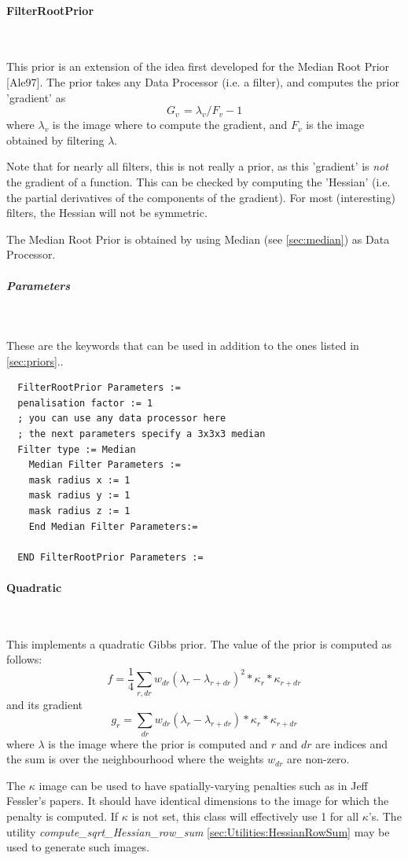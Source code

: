 \documentclass{article}
\newcommand{\subsubsubsection}[1]{\paragraph{#1}\mbox{} \\}
\newcommand{\subsubsubsubsection}[1]{\subparagraph{#1} \mbox{} \\}
\begin{document}
{{{ \subsubsubsection{FilterRootPrior}
}
This prior is an extension of the idea first developed for the 
Median Root Prior [Ale97]. The prior takes any Data Processor 
(i.e. a filter), and computes the prior 'gradient' as 
\[
G_{v\,} =\lambda _{v} /F_{v}  -1
\]
\noindent where 
$\lambda _{v} $
 is the image where to compute the gradient, and 
$F_{v} $ is the image obtained by filtering $\lambda $.

Note that for nearly all filters, this is not really a prior, as 
this 'gradient' is \textit{not} the gradient of a function. This can 
be checked by computing the 'Hessian' (i.e. the partial derivatives 
of the components of the gradient). For most (interesting) filters, 
the Hessian will not be symmetric.


The Median Root Prior is obtained by using Median (see \ref{sec:median}) 
as Data Processor.

{ \subsubsubsubsection{Parameters}
}
These are the keywords that can be used in addition to the ones listed in \ref{sec:priors}..
  \begin{verbatim}
  FilterRootPrior Parameters :=
  penalisation factor := 1
  ; you can use any data processor here
  ; the next parameters specify a 3x3x3 median
  Filter type := Median
    Median Filter Parameters :=
    mask radius x := 1   
    mask radius y := 1
    mask radius z := 1
    End Median Filter Parameters:=

  END FilterRootPrior Parameters :=
 \end{verbatim}


{ \subsubsubsection{Quadratic} \label{sec:priors:Quadratic}
}
This implements a quadratic Gibbs prior. The value of the prior is computed as follows:
 \[
 f = \frac{1}{4} \sum_{r,dr} w_{dr} (\lambda_r - \lambda_{r+dr})^2 * \kappa_r * \kappa_{r+dr}
 \]
 and its gradient
 \[
  g_r = \sum_{dr} w_{dr} (\lambda_r - \lambda_{r+dr}) * \kappa_r * \kappa_{r+dr}
  \]
  \noindent where $\lambda$ is the image where the prior is computed
   and $r$ and $dr$ are indices and the sum
  is over the neighbourhood where the weights $w_{dr}$ are non-zero.

  The $\kappa$ image can be used to have spatially-varying penalties such as in 
  Jeff Fessler's papers. It should have identical dimensions to the image for which the
  penalty is computed. If $\kappa$ is not set, this class will effectively
  use 1 for all $\kappa$'s.
  The utility \textit{compute\_sqrt\_Hessian\_row\_sum} \ref{sec:Utilities:HessianRowSum} may be used to generate such images.

}}
\end{document}
